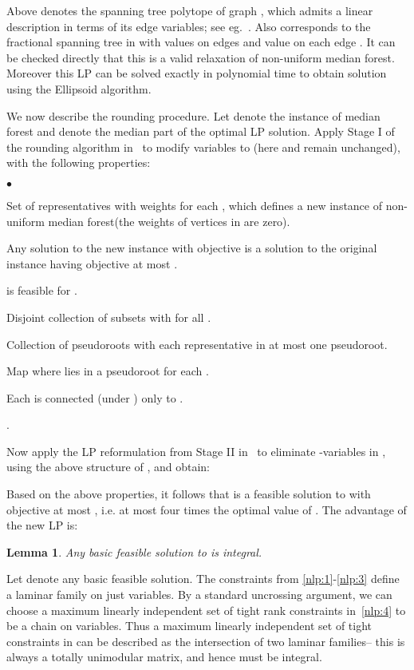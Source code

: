 \documentclass[11pt,twoside,a4paper]{article}
\newtheorem{lemma}[theorem]{Lemma}
\newenvironment{proof}{

\noindent{\bf Proof:}} {\hfill


}
\newcommand{\initOneLiners}{\setlength{\itemsep}{0pt}
    \setlength{\parsep }{0pt}
    \setlength{\topsep }{0pt}
}
\newenvironment{OneLiners}[1][\ensuremath{\bullet}]
    {\begin{list}
        {#1}
        {\initOneLiners}}
    {\end{list}}
\def\kmf{ median forest\xspace}
\begin{document}
Above  denotes the spanning tree polytope of graph , which admits a linear description in terms of its edge
variables; see eg.~\cite{Schr-book}. Also  corresponds to the fractional spanning tree in  with
values  on edges  and value  on each edge . It can be checked directly that this is a valid
relaxation of non-uniform \kmf. Moreover this LP can be solved exactly in polynomial time to obtain solution
 using the Ellipsoid algorithm.

We now describe the rounding procedure. Let \I denote the instance of \kmf and  denote the median part of the optimal LP solution. Apply Stage I of the rounding algorithm
in~\cite{KKNSS11} to modify variables  to  (here  and  remain unchanged), with the
following properties:
\begin{OneLiners}
 \item Set  of representatives with weights  for each , which defines a new instance \J of non-uniform \kmf (the weights of
 vertices in  are zero).
 \item Any solution to the new instance \J with objective  is a solution to the original instance \I having
 objective at most .
 \item  is feasible for .
 \item Disjoint collection of subsets  with  for all .
 \item Collection of pseudoroots  with each representative in at
most one pseudoroot.
 \item Map  where  lies in a pseudoroot for each .
 \item Each  is connected (under ) only to .
 \item .
\end{OneLiners}

\medskip
Now apply the LP reformulation from Stage II in~\cite{KKNSS11} to eliminate -variables in \LP, using the above
structure of , and obtain: \begin{small}\end{small}

Based on the above properties, it follows that  is a feasible solution to  with objective
at most , i.e. at most four times the optimal value of . The advantage of the new LP
is:
\begin{lemma}
Any basic feasible solution to  is integral.
\end{lemma}
\begin{proof}
Let  denote any basic feasible solution. The constraints from  \eqref{nlp:1}-\eqref{nlp:3} define a laminar
family on just  variables. By a standard uncrossing argument, we can choose a maximum linearly independent set of
tight rank constraints in~\eqref{nlp:4} to be a chain on  variables. Thus a maximum linearly independent set of
tight constraints in  can be described as the intersection of two laminar families-- this is always
a totally unimodular matrix, and hence  must be integral.
\end{proof}
\end{document}
